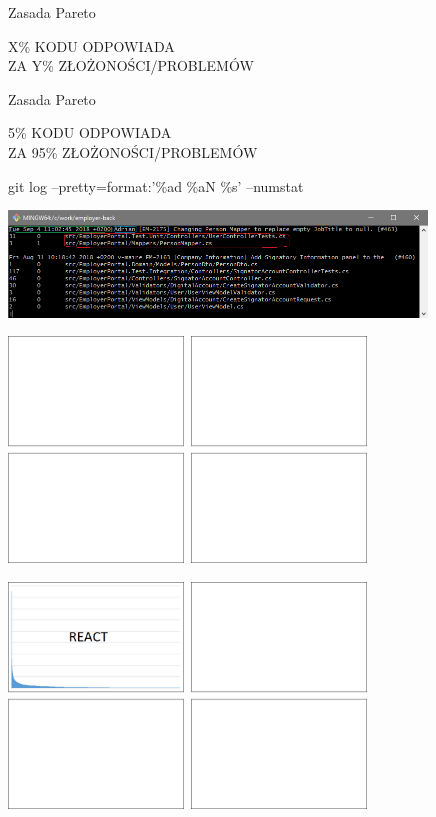 \documentclass{beamer}
\begin{document}
\begin{frame}{Zasada Pareto}
\begin{center}
\Large{{\color{red}X\%} KODU ODPOWIADA\\
ZA {\color{red}Y\%} ZŁOŻONOŚCI/PROBLEMÓW}
\end{center}
\end{frame}

\begin{frame}{Zasada Pareto}
\begin{center}
\Large{{\color{red}5\%} KODU ODPOWIADA\\
ZA {\color{red}95\%} ZŁOŻONOŚCI/PROBLEMÓW}
\end{center}
\end{frame}

\begin{frame}{git log --pretty=format:'\%ad \%aN \%s' --numstat}
\begin{center}
  	\includegraphics[height=2.85cm]{git_log.png}
\end{center}
\end{frame}

\begin{frame}{}
\begin{center}
  	\includegraphics[height=6cm]{git_log1.png}
\end{center}
\end{frame}

\begin{frame}{}
\begin{center}
  	\includegraphics[height=6cm]{git_log2.png}
\end{center}
\end{frame}
\end{document}
